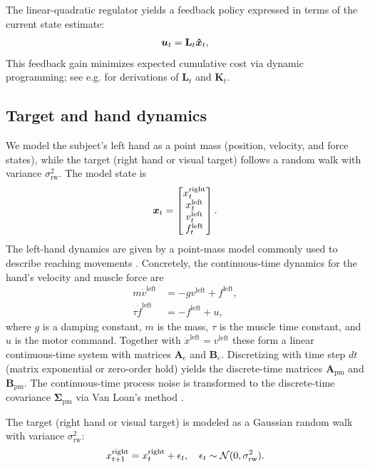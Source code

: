 \documentclass{article}
\begin{document}
The linear-quadratic regulator yields a feedback policy expressed in terms of the current state estimate:
\begin{align}
    {\bm u}_t = \mathbf L_t {\bm{\hat x}}_t,
\end{align}
This feedback gain minimizes expected cumulative cost via dynamic programming; see e.g. \citet{kochenderfer2022algorithms} for derivations of $\mathbf L_t$ and $\mathbf K_t$.

\subsection{Target and hand dynamics}

We model the subject's left hand as a point mass (position, velocity, and force states), while the target (right hand or visual target) follows a random walk with variance $\sigma_\text{rw}^2$. The model state is
\begin{align}
    {\bm x}_t = \begin{bmatrix}
        x^\text{right}_t \\ x^\text{left}_t \\ v^\text{left}_t \\ f^\text{left}_t
    \end{bmatrix}.
\end{align}
The left-hand dynamics are given by a point-mass model commonly used to describe reaching movements \citep[see e.g.][for details]{kasuga2022integration}. Concretely, the continuous-time dynamics for the hand's velocity and muscle force are
\begin{align}
    m \dot v^{\text{left}} &= - g v^{\text{left}} + f^{\text{left}}, \\
    \tau \dot f^{\text{left}} &= - f^{\text{left}} + u,
\end{align}
where $g$ is a damping constant, $m$ is the mass, $\tau$ is the muscle time constant, and $u$ is the motor command. Together with $\dot x^{\text{left}} = v^{\text{left}}$ these form a linear continuous-time system with matrices $\mathbf A_\mathrm{c}$ and $\mathbf B_\mathrm{c}$. Discretizing with time step $dt$ (matrix exponential or zero-order hold) yields the discrete-time matrices $\mathbf A_{\mathrm{pm}}$ and $\mathbf B_{\mathrm{pm}}$. The continuous-time process noise is transformed to the discrete-time covariance $\mathbf \Sigma_{\mathrm{pm}}$ via Van Loan's method \citep{van2003computing}.

The target (right hand or visual target) is modeled as a Gaussian random walk with variance $\sigma_\text{rw}^2$:
\begin{align}
    x^\text{right}_{t+1} = x^\text{right}_t + \epsilon_t, \quad \epsilon_t \sim \operatorname{\mathcal{N}}(0, \sigma_\text{rw}^2).
\end{align}
\end{document}
